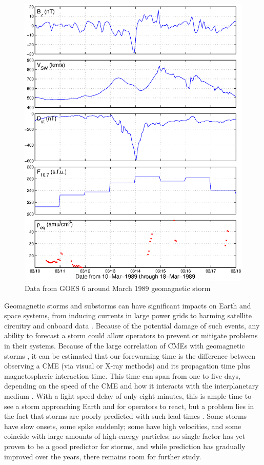 \begin{figure}[htp!]
	\centering
	\includegraphics[width=1\linewidth]{Figures/alldata-GOES6-10Mar1989-18Mar1989.eps}%
	\caption{Data from GOES 6 around March 1989 geomagnetic storm}
	\label{fig:alldata-GOES6-1989-1989}
\end{figure}



Geomagnetic storms and substorms can have significant impacts on Earth and space systems, from inducing currents in large power grids to harming satellite circuitry and onboard data \citep{1989Storm}. Because of the potential damage of such events, any ability to forecast a storm could allow operators to prevent or mitigate problems in their systems. Because of the large correlation of CMEs with geomagnetic storms \citep{Yermolaev}, it can be estimated that our forewarning time is the difference between observing a CME (via visual or X-ray methods) and its propagation time plus magnetospheric interaction time. This time can span from one to five days, depending on the speed of the CME and how it interacts with the interplanetary medium \citep{StormSources}. With a light speed delay of only eight minutes, this is ample time to see a storm approaching Earth and for operators to react, but a problem lies in the fact that storms are poorly predicted with such lead times \citep{WeigelDecision}. Some storms have slow onsets, some spike suddenly; some have high velocities, and some coincide with large amounts of high-energy particles; no single factor has yet proven to be a good predictor for storms, and while prediction has gradually improved over the years, there remains room for further study. 

